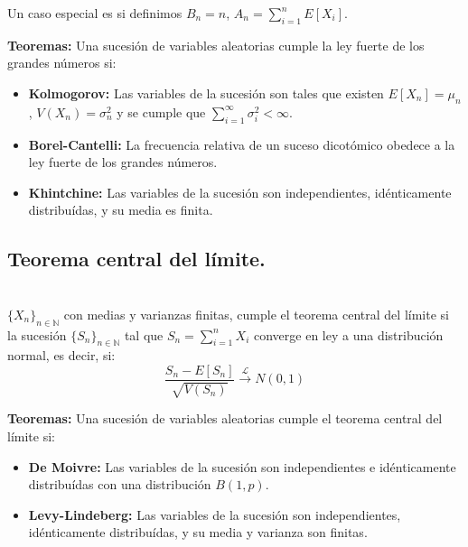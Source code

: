 \documentclass[oneside,spanish,a4paper]{article}
\newcommand{\subsectioncol}[1]{\subsection{{\color{red} #1}}}
\begin{document}
Un caso especial es si definimos $B_n=n$, $A_n=\sum_{i=1}^nE[X_i]$.

\textbf{Teoremas:} Una sucesi\'on de variables aleatorias cumple la ley fuerte de los grandes n\'umeros si:
\begin{itemize}
\item \textbf{Kolmogorov:} Las variables de la sucesi\'on son tales que existen $E[X_n]=\mu_n$, $V(X_n)=\sigma^2_n$ y se cumple que $\sum_{i=1}^{\infty}\sigma_i^2<\infty$.
\item \textbf{Borel-Cantelli:} La frecuencia relativa de un suceso dicot\'omico obedece a la ley fuerte de los grandes n\'umeros.
\item \textbf{Khintchine:} Las variables de la sucesi\'on son independientes, id\'enticamente distribu\'idas, y su media es finita.
\end{itemize}

\subsectioncol{Teorema central del l\'imite.}
~\\
$\{X_n\}_{n\in \mathbb{N}}$ con medias y varianzas finitas, cumple el teorema central del l\'imite si la sucesi\'on $\{S_n\}_{n\in \mathbb{N}}$ tal que $S_n=\sum_{i=1}^nX_i$ converge en ley a una distribuci\'on normal, es decir, si:
\[\dfrac{S_n-E[S_n]}{\sqrt{V(S_n)}}\overset{\mathcal{L}}{\to}N(0,1)\]


\textbf{Teoremas:} Una sucesi\'on de variables aleatorias cumple el teorema central del l\'imite si:
\begin{itemize}
\item \textbf{De Moivre:} Las variables de la sucesi\'on son independientes e id\'enticamente distribu\'idas con una distribuci\'on $B(1,p)$.
\item \textbf{Levy-Lindeberg:} Las variables de la sucesi\'on son independientes, id\'enticamente distribu\'idas, y su media y varianza son finitas.
\end{itemize}
\end{document}
